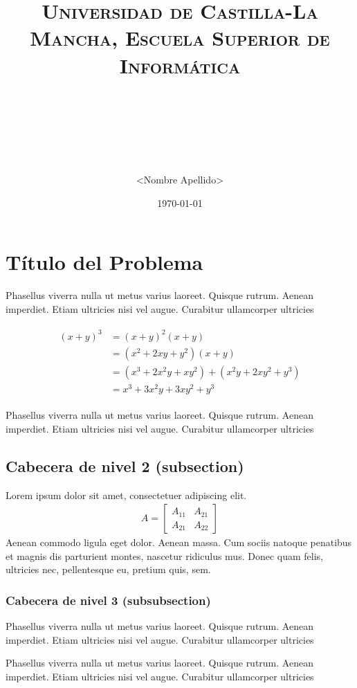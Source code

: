 \documentclass[paper=a4,fontsize=11pt]{scrartcl}
\title{	
\normalfont \normalsize 
\textsc{Universidad de Castilla-La Mancha, Escuela Superior de Informática} \\ [25pt]
\horrule{0.5pt} \\[0.4cm] %
\huge <Título de la Tarea> \\
\horrule{2pt} \\[0.5cm] %
}
\author{<Nombre Apellido>}
\date{\normalsize\today}
\numberwithin{equation}{section} %
\numberwithin{figure}{section}
\numberwithin{table}{section}
\begin{document}
\maketitle

\section{Título del Problema}

Phasellus viverra nulla ut metus varius laoreet. Quisque rutrum. Aenean imperdiet. Etiam ultricies nisi vel augue. Curabitur ullamcorper ultricies

\begin{align} 
\begin{split}
(x+y)^3 	&= (x+y)^2(x+y)\\
&=(x^2+2xy+y^2)(x+y)\\
&=(x^3+2x^2y+xy^2) + (x^2y+2xy^2+y^3)\\
&=x^3+3x^2y+3xy^2+y^3
\end{split}					
\end{align}

Phasellus viverra nulla ut metus varius laoreet. Quisque rutrum. Aenean imperdiet. Etiam ultricies nisi vel augue. Curabitur ullamcorper ultricies


\subsection{Cabecera de nivel 2 (subsection)}

Lorem ipsum dolor sit amet, consectetuer adipiscing elit. 
\begin{align}
A = 
\begin{bmatrix}
A_{11} & A_{21} \\
A_{21} & A_{22}
\end{bmatrix}
\end{align}
Aenean commodo ligula eget dolor. Aenean massa. Cum sociis natoque penatibus et magnis dis parturient montes, nascetur ridiculus mus. Donec quam felis, ultricies nec, pellentesque eu, pretium quis, sem.



\subsubsection{Cabecera de nivel 3 (subsubsection)}

Phasellus viverra nulla ut metus varius laoreet. Quisque rutrum. Aenean imperdiet. Etiam ultricies nisi vel augue. Curabitur ullamcorper ultricies

Phasellus viverra nulla ut metus varius laoreet. Quisque rutrum. Aenean imperdiet. Etiam ultricies nisi vel augue. Curabitur ullamcorper ultricies
\end{document}
